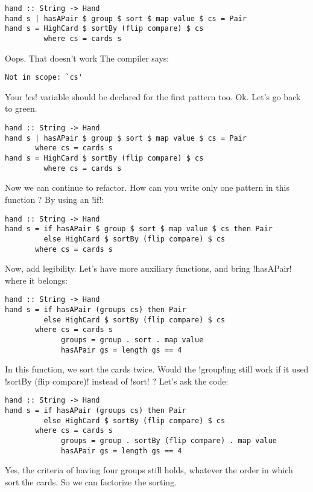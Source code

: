 \begin{lstlisting}[frame=single]
hand :: String -> Hand
hand s | hasAPair $ group $ sort $ map value $ cs = Pair
hand s = HighCard $ sortBy (flip compare) $ cs
         where cs = cards s
\end{lstlisting}   
\failure Oops. That doesn't work
\lhN The compiler says:
\begin{small}
\begin{verbatim}
Not in scope: `cs'
\end{verbatim}
\end{small}
Your \il!cs! variable should be declared for the first pattern too.
\lhA Ok. Let's go back to green.
\begin{lstlisting}[frame=single]
hand :: String -> Hand
hand s | hasAPair $ group $ sort $ map value $ cs = Pair
       where cs = cards s
hand s = HighCard $ sortBy (flip compare) $ cs
         where cs = cards s
\end{lstlisting}
\success Now we can continue to refactor.
\lhN How can you write only one pattern in this function ?
\lhA \success By using an \il!if!:
\begin{lstlisting}[frame=single]
hand :: String -> Hand
hand s = if hasAPair $ group $ sort $ map value $ cs then Pair
         else HighCard $ sortBy (flip compare) $ cs
       where cs = cards s
\end{lstlisting}
\lhN Now, add legibility.
\lhA \success Let's have more auxiliary functions, and bring \il!hasAPair! where it belongs:
\begin{lstlisting}[frame=single]
hand :: String -> Hand
hand s = if hasAPair (groups cs) then Pair
         else HighCard $ sortBy (flip compare) $ cs
       where cs = cards s
             groups = group . sort . map value
             hasAPair gs = length gs == 4 
\end{lstlisting}
\lhN In this function, we sort the cards twice. Would the \il!group!ing still work if it used \il!sortBy (flip compare)! instead of \il!sort! ?
\lhA \success Let's ask the code:
\begin{lstlisting}[frame=single]
hand :: String -> Hand
hand s = if hasAPair (groups cs) then Pair
         else HighCard $ sortBy (flip compare) $ cs
       where cs = cards s
             groups = group . sortBy (flip compare) . map value
             hasAPair gs = length gs == 4 
\end{lstlisting}
\success Yes, the criteria of having four groups still holds, whatever the order in which sort the cards.
\lhN So we can factorize the sorting.
